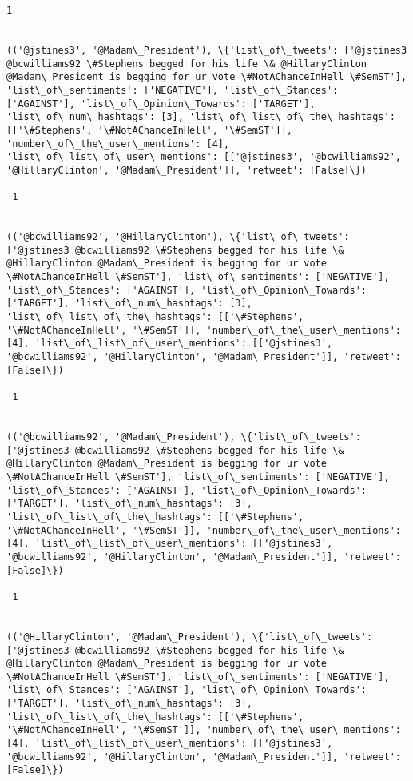 \documentclass[11pt]{article}
\begin{document}
\begin{Verbatim}[commandchars=\\\{\}]
 1
 

(('@jstines3', '@Madam\_President'), \{'list\_of\_tweets': ['@jstines3 @bcwilliams92 \#Stephens begged for his life \& @HillaryClinton @Madam\_President is begging for ur vote \#NotAChanceInHell \#SemST'], 'list\_of\_sentiments': ['NEGATIVE'], 'list\_of\_Stances': ['AGAINST'], 'list\_of\_Opinion\_Towards': ['TARGET'], 'list\_of\_num\_hashtags': [3], 'list\_of\_list\_of\_the\_hashtags': [['\#Stephens', '\#NotAChanceInHell', '\#SemST']], 'number\_of\_the\_user\_mentions': [4], 'list\_of\_list\_of\_user\_mentions': [['@jstines3', '@bcwilliams92', '@HillaryClinton', '@Madam\_President']], 'retweet': [False]\})

 1
 

(('@bcwilliams92', '@HillaryClinton'), \{'list\_of\_tweets': ['@jstines3 @bcwilliams92 \#Stephens begged for his life \& @HillaryClinton @Madam\_President is begging for ur vote \#NotAChanceInHell \#SemST'], 'list\_of\_sentiments': ['NEGATIVE'], 'list\_of\_Stances': ['AGAINST'], 'list\_of\_Opinion\_Towards': ['TARGET'], 'list\_of\_num\_hashtags': [3], 'list\_of\_list\_of\_the\_hashtags': [['\#Stephens', '\#NotAChanceInHell', '\#SemST']], 'number\_of\_the\_user\_mentions': [4], 'list\_of\_list\_of\_user\_mentions': [['@jstines3', '@bcwilliams92', '@HillaryClinton', '@Madam\_President']], 'retweet': [False]\})

 1
 

(('@bcwilliams92', '@Madam\_President'), \{'list\_of\_tweets': ['@jstines3 @bcwilliams92 \#Stephens begged for his life \& @HillaryClinton @Madam\_President is begging for ur vote \#NotAChanceInHell \#SemST'], 'list\_of\_sentiments': ['NEGATIVE'], 'list\_of\_Stances': ['AGAINST'], 'list\_of\_Opinion\_Towards': ['TARGET'], 'list\_of\_num\_hashtags': [3], 'list\_of\_list\_of\_the\_hashtags': [['\#Stephens', '\#NotAChanceInHell', '\#SemST']], 'number\_of\_the\_user\_mentions': [4], 'list\_of\_list\_of\_user\_mentions': [['@jstines3', '@bcwilliams92', '@HillaryClinton', '@Madam\_President']], 'retweet': [False]\})

 1
 

(('@HillaryClinton', '@Madam\_President'), \{'list\_of\_tweets': ['@jstines3 @bcwilliams92 \#Stephens begged for his life \& @HillaryClinton @Madam\_President is begging for ur vote \#NotAChanceInHell \#SemST'], 'list\_of\_sentiments': ['NEGATIVE'], 'list\_of\_Stances': ['AGAINST'], 'list\_of\_Opinion\_Towards': ['TARGET'], 'list\_of\_num\_hashtags': [3], 'list\_of\_list\_of\_the\_hashtags': [['\#Stephens', '\#NotAChanceInHell', '\#SemST']], 'number\_of\_the\_user\_mentions': [4], 'list\_of\_list\_of\_user\_mentions': [['@jstines3', '@bcwilliams92', '@HillaryClinton', '@Madam\_President']], 'retweet': [False]\})


\end{Verbatim}
\end{document}
